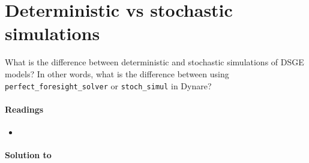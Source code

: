 \section[Deterministic vs. stochastic simulations]{Deterministic vs stochastic simulations\label{ex:SimulationsDeterministicStochastic}}
What is the difference between deterministic and stochastic simulations of DSGE models?
In other words, what is the difference between using \texttt{perfect\_foresight\_solver} or \texttt{stoch\_simul} in Dynare?

\paragraph{Readings}
\begin{itemize}
  \item \textcite{Mutschler_2023_UnderstandingDeterministicSimulations}
\end{itemize}

\begin{solution}\textbf{Solution to }
\ifDisplaySolutions

\fi
\newpage
\end{solution}